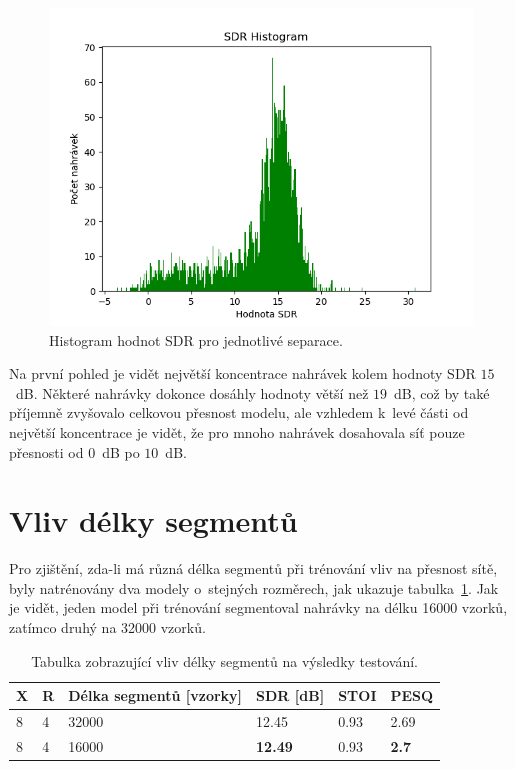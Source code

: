 \begin{figure}[H]
    \centering
    \includegraphics[scale=0.8]{obrazky-figures/sdrhistogramX8R2.png}
    \caption{\label{fig:sdrhistogram}Histogram hodnot SDR pro jednotlivé separace.}
\end{figure}

Na první pohled je vidět největší koncentrace nahrávek kolem hodnoty SDR $15$~dB. Některé nahrávky dokonce  dosáhly hodnoty větší než $19$~dB, což by také příjemně zvyšovalo celkovou přesnost modelu, ale vzhledem k~levé části od největší koncentrace je vidět, že pro mnoho nahrávek dosahovala síť pouze přesnosti od $0$~dB po $10$~dB. 


\section{Vliv délky segmentů}
Pro zjištění, zda-li má různá délka segmentů při trénování vliv na přesnost sítě, byly natrénovány dva modely o~stejných rozměrech, jak ukazuje tabulka~\ref{tab:vliv-segment-length}. Jak je vidět, jeden model při trénování segmentoval nahrávky na délku 16000 vzorků, zatímco druhý na 32000 vzorků.

\begin{table}[!htbp]
\centering
\caption{Tabulka zobrazující vliv délky segmentů na výsledky testování.}
\label{tab:vliv-segment-length}
\begin{tabular}{|l|l|l|l|l|l|}
\hline
\textbf{X} & \textbf{R} & \textbf{Délka segmentů {[}vzorky{]}} & \textbf{SDR {[}dB{]}} & \textbf{STOI} & \textbf{PESQ} \\ \hline
8 & 4 & 32000 & 12.45 & 0.93 & 2.69 \\ \hline
8 & 4 & 16000 & \textbf{12.49} & 0.93 & \textbf{2.7} \\ \hline
\end{tabular}
\end{table}

